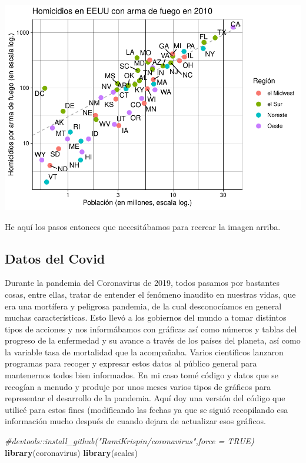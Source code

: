\documentclass[
]{article}
\newenvironment{Shaded}{\begin{snugshade}}{\end{snugshade}}
\newcommand{\CommentTok}[1]{\textcolor[rgb]{0.56,0.35,0.01}{\textit{#1}}}
\newcommand{\FunctionTok}[1]{\textcolor[rgb]{0.13,0.29,0.53}{\textbf{#1}}}
\newcommand{\NormalTok}[1]{#1}
\begin{document}
\includegraphics{Taller-2_files/figure-latex/el gráfico que buscábamos (datos de asesinatos)-1.pdf}

He aquí los pasos entonces que necesitábamos para recrear la imagen
arriba.

\subsection{Datos del Covid}\label{datos-del-covid}

Durante la pandemia del Coronavirus de 2019, todos pasamos por bastantes
cosas, entre ellas, tratar de entender el fenómeno inaudito en nuestras
vidas, que era una mortífera y peligrosa pandemia, de la cual
desconocíamos en general muchas características. Esto llevó a los
gobiernos del mundo a tomar distintos tipos de acciones y nos
informábamos con gráficas así como números y tablas del progreso de la
enfermedad y su avance a través de los países del planeta, así como la
variable tasa de mortalidad que la acompañaba. Varios científicos
lanzaron programas para recoger y expresar estos datos al público
general para mantenernos todos bien informados. En mi caso tomé código y
datos que se recogían a menudo y produje por unos meses varios tipos de
gráficos para representar el desarrollo de la pandemia. Aquí doy una
versión del código que utilicé para estos fines (modificando las fechas
ya que se siguió recopilando esa información mucho después de cuando
dejara de actualizar esos gráficos.

\begin{Shaded}
\begin{Highlighting}[]
\CommentTok{\#devtools::install\_github("RamiKrispin/coronavirus",force = TRUE)}
\FunctionTok{library}\NormalTok{(coronavirus)}
\FunctionTok{library}\NormalTok{(scales)}
\end{Highlighting}
\end{Shaded}
\end{document}

